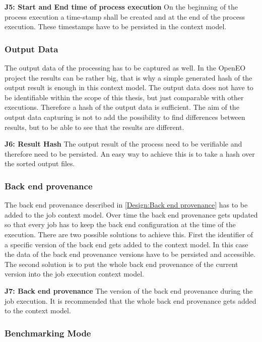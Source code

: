 \documentclass[draft,final]{vutinfth} %
\begin{document}
\textbf{J5: Start and End time of process execution}
On the beginning of the process execution a time-stamp shall  be created and at the end of the process execution. These timestamps have to be persisted in the context model.

\subsubsection{Output Data}\label{Job:Output Data}
The output data of the processing has to be captured as well. In the OpenEO project the results can be rather big, that is why a simple generated hash of the output result is enough in this context model. The output data does not have to be identifiable within the scope of this thesis, but just comparable with other executions. Therefore a hash of the output data is sufficient. The aim of the output data capturing is not to add the possibility to find differences between results, but to be able to see that the results are different. 

\textbf{J6: Result Hash}
The output result of the process need to be verifiable and therefore need to be persisted. An easy way to achieve this is to take a hash over the sorted output files. 

\subsubsection{Back end provenance}\label{Job:Back end provenance}
The back end provenance described in \ref{Design:Back end provenance} has to be added to the job context model. Over time the back end provenance gets updated so that every job has to keep the back end configuration at the time of the execution. There are two possible solutions to achieve this. First the  identifier of a specific version of the back end gets added to the context model. In this case the data of the back end provenance versions have to be persisted and accessible. The second solution is to put the whole back end provenance of the current version into the job execution context model.

\textbf{J7: Back end provenance} 
The version of the back end provenance during the job execution. It is recommended that  the whole back end provenance gets added to the context model.

\subsubsection{Benchmarking Mode}\label{Job:Benchmarking}
\end{document}
